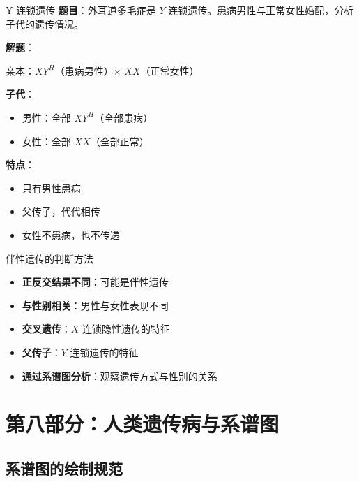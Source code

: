 \documentclass[a4paper,11pt]{ctexart}
\begin{document}
\begin{examplebox}{Y 连锁遗传}
\textbf{题目}：外耳道多毛症是 $Y$ 连锁遗传。患病男性与正常女性婚配，分析子代的遗传情况。

\textbf{解题}：

亲本：$XY^H$（患病男性）$\times$ $XX$（正常女性）

\textbf{子代}：
\begin{itemize}[leftmargin=2em]
    \item 男性：全部 $XY^H$（全部患病）
    \item 女性：全部 $XX$（全部正常）
\end{itemize}

\textbf{特点}：
\begin{itemize}[leftmargin=2em]
    \item 只有男性患病
    \item 父传子，代代相传
    \item 女性不患病，也不传递
\end{itemize}
\end{examplebox}

\begin{lemmabox}{伴性遗传的判断方法}
\begin{itemize}[leftmargin=2em]
    \item \textbf{正反交结果不同}：可能是伴性遗传
    \item \textbf{与性别相关}：男性与女性表现不同
    \item \textbf{交叉遗传}：$X$ 连锁隐性遗传的特征
    \item \textbf{父传子}：$Y$ 连锁遗传的特征
    \item \textbf{通过系谱图分析}：观察遗传方式与性别的关系
\end{itemize}
\end{lemmabox}


\section{第八部分：人类遗传病与系谱图}

\subsection{系谱图的绘制规范}
\end{document}
